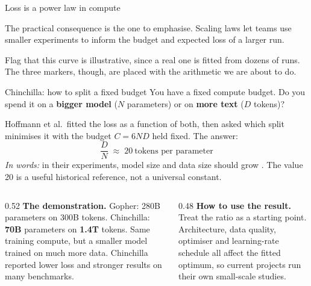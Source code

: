 \documentclass[aspectratio=169,10pt]{beamer}
\begin{document}
\begin{frame}{Loss is a power law in compute}
{  The practical consequence is the one to emphasise. Scaling laws let teams
  use smaller experiments to inform the budget and expected loss of a larger
  run.

  Flag that this curve is illustrative, since a real one is fitted from dozens
  of runs. The three markers, though, are placed with the arithmetic we are
  about to do.}
\end{frame}

\begin{frame}[shrink=5]{Chinchilla: how to split a fixed budget}
  You have a fixed compute budget. Do you spend it on a \textbf{bigger model}
  ($N$ parameters) or on \textbf{more text} ($D$ tokens)?
  \vspace{0.3em}

  Hoffmann et al.\ fitted the loss as a function of both, then asked which split
  minimises it with the budget $C = 6ND$ held fixed. The answer:
  \[
    \frac{D}{N} \;\approx\; 20\ \text{tokens per parameter}
  \]
  \emph{In words:} in their experiments, model size and data size should grow
  . The value 20 is a useful historical reference, not a
  universal constant.
  \vspace{0.3em}
  \begin{columns}[T]
    \begin{column}{0.52\textwidth}
      \small
      \textbf{The demonstration.} Gopher: 280B parameters on 300B tokens.
      Chinchilla: \textbf{70B} parameters on \textbf{1.4T} tokens. Same
      training compute, but a smaller model trained on much more data.
      Chinchilla reported lower loss and stronger results on many benchmarks.
    \end{column}
    \begin{column}{0.48\textwidth}
      \small
      \textbf{How to use the result.} Treat the ratio as a starting point.
      Architecture, data quality, optimiser and learning-rate schedule all
      affect the fitted optimum, so current projects run their own small-scale
      studies.
    \end{column}
  \end{columns}
\end{frame}
\end{document}
